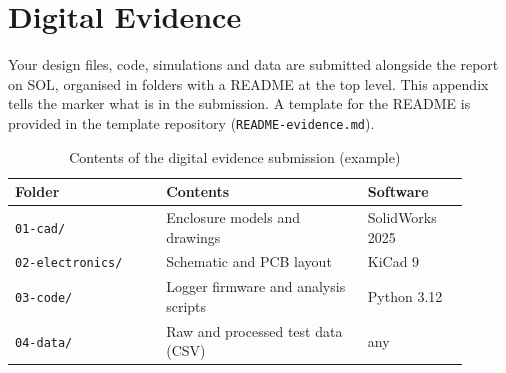 \chapter{Digital Evidence}
\label{app:digital}

\begin{guidance}
Your design files, code, simulations and data are submitted alongside the
report on SOL, organised in folders with a README at the top level. This
appendix tells the marker what is in the submission. A template for the
README is provided in the template repository (\texttt{README-evidence.md}).
\end{guidance}

\begin{table}[htbp]
  \centering
  \caption{Contents of the digital evidence submission (example)}
  \label{tab:evidence}
  \small
  \begin{tabular}{p{0.3\linewidth}p{0.4\linewidth}p{0.2\linewidth}}
    \toprule
    Folder & Contents & Software \\
    \midrule
    \texttt{01-cad/}        & Enclosure models and drawings & SolidWorks 2025 \\
    \texttt{02-electronics/} & Schematic and PCB layout     & KiCad 9 \\
    \texttt{03-code/}       & Logger firmware and analysis scripts & Python 3.12 \\
    \texttt{04-data/}       & Raw and processed test data (CSV) & any \\
    \bottomrule
  \end{tabular}
\end{table}
